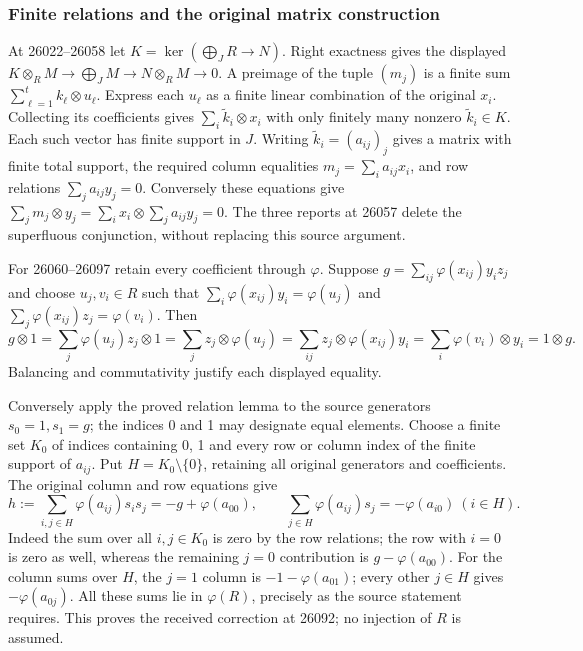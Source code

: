 \subsubsection{Finite relations and the original matrix construction}\label{algebra-proof-021-finite-relations-and-the-original-matrix-construction}

At 26022--26058 let \(K=\ker(\bigoplus_JR\to N)\). Right exactness gives the displayed \(K\otimes_RM\to\bigoplus_JM\to N\otimes_RM\to0\). A preimage of the tuple \((m_j)\) is a finite sum \(\sum_{\ell=1}^t k_\ell\otimes u_\ell\). Express each \(u_\ell\) as a finite linear combination of the original \(x_i\). Collecting its coefficients gives \(\sum_i\widetilde k_i\otimes x_i\) with only finitely many nonzero \(\widetilde k_i\in K\). Each such vector has finite support in \(J\). Writing \(\widetilde k_i=(a_{ij})_j\) gives a matrix with finite total support, the required column equalities \(m_j=\sum_i a_{ij}x_i\), and row relations \(\sum_j a_{ij}y_j=0\). Conversely these equations give \(\sum_jm_j\otimes y_j=\sum_i x_i\otimes\sum_j a_{ij}y_j=0\). The three reports at 26057 delete the superfluous conjunction, without replacing this source argument.

For 26060--26097 retain every coefficient through \(\varphi\). Suppose \(g=\sum_{ij}\varphi(x_{ij})y_i z_j\) and choose \(u_j,v_i\in R\) such that \(\sum_i\varphi(x_{ij})y_i=\varphi(u_j)\) and \(\sum_j\varphi(x_{ij})z_j=\varphi(v_i)\). Then \[
g\otimes1
=\sum_j\varphi(u_j)z_j\otimes1
=\sum_j z_j\otimes\varphi(u_j)
=\sum_{ij}z_j\otimes\varphi(x_{ij})y_i
=\sum_i\varphi(v_i)\otimes y_i
=1\otimes g .
\] Balancing and commutativity justify each displayed equality.

Conversely apply the proved relation lemma to the source generators \(s_0=1,s_1=g\); the indices 0 and 1 may designate equal elements. Choose a finite set \(K_0\) of indices containing 0, 1 and every row or column index of the finite support of \(a_{ij}\). Put \(H=K_0\setminus\{0\}\), retaining all original generators and coefficients. The original column and row equations give \[
h:=\sum_{i,j\in H}\varphi(a_{ij})s_i s_j
=-g+\varphi(a_{00}),\qquad
\sum_{j\in H}\varphi(a_{ij})s_j=-\varphi(a_{i0})\ (i\in H).
\] Indeed the sum over all \(i,j\in K_0\) is zero by the row relations; the row with \(i=0\) is zero as well, whereas the remaining \(j=0\) contribution is \(g-\varphi(a_{00})\). For the column sums over \(H\), the \(j=1\) column is \(-1-\varphi(a_{01})\); every other \(j\in H\) gives \(-\varphi(a_{0j})\). All these sums lie in \(\varphi(R)\), precisely as the source statement requires. This proves the received correction at 26092; no injection of \(R\) is assumed.

